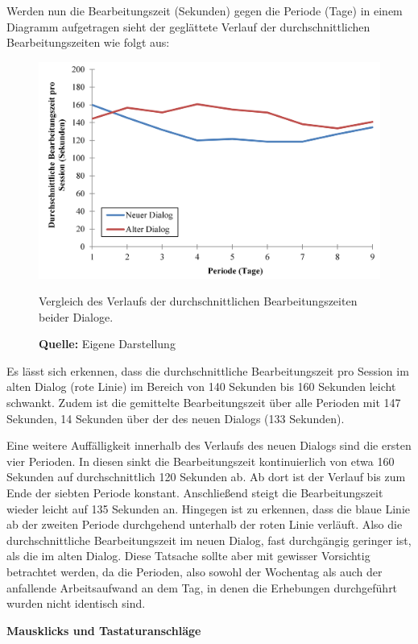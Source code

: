 Werden nun die Bearbeitungszeit (Sekunden) gegen die Periode (Tage) in einem Diagramm aufgetragen sieht der geglättete Verlauf der durchschnittlichen Bearbeitungszeiten wie folgt aus:
\begin{figure}[H]
  \centering
  \includegraphics[]{img/Bearbeitungszeit_Verlauf.png}
  \caption{Vergleich des Verlaufs der durchschnittlichen Bearbeitungszeiten beider Dialoge.}
  \caption*{\textbf{Quelle:} Eigene Darstellung}
  \label{fig:BearbeitungszeitVerlauf}
\end{figure}
Es lässt sich erkennen, dass die durchschnittliche Bearbeitungszeit pro Session im alten Dialog (rote Linie) im Bereich von 140 Sekunden bis 160 Sekunden leicht schwankt. Zudem ist die gemittelte Bearbeitungszeit über alle Perioden mit 147 Sekunden, 14 Sekunden über der des neuen Dialogs (133 Sekunden).

Eine weitere Auffälligkeit innerhalb des Verlaufs des neuen Dialogs sind die ersten vier Perioden. In diesen sinkt die Bearbeitungszeit kontinuierlich von etwa 160 Sekunden auf durchschnittlich 120 Sekunden ab. Ab dort ist der Verlauf bis zum Ende der siebten Periode konstant. Anschließend steigt die Bearbeitungszeit wieder leicht auf 135 Sekunden an. Hingegen ist zu erkennen, dass die blaue Linie ab der zweiten Periode durchgehend unterhalb der roten Linie verläuft. Also die durchschnittliche Bearbeitungszeit im neuen Dialog, fast durchgängig geringer ist, als die im alten Dialog. Diese Tatsache sollte aber mit gewisser Vorsichtig betrachtet werden, da die Perioden, also sowohl der Wochentag als auch der anfallende Arbeitsaufwand an dem Tag, in denen die Erhebungen durchgeführt wurden nicht identisch sind.

\textbf{Mausklicks und Tastaturanschläge}

